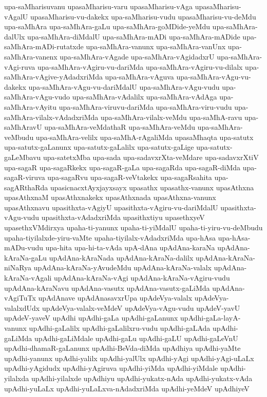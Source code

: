 {upa-saMharisuvanu
upasaMharisu-varu
upasaMharisu-vAga
upasaMharisu-vAgalU
upasaMharisu-vu-dakekx
upa-saMharisu-vudu
upasaMharisu-vu-deMdu
upa-saMhAra
upa-saMhAra-gaLu
upa-saMhAra-goMDide-yeMdu
upa-saMhAra-dalUlx
upa-saMhAra-diMdalU
upa-saMhAra-mADi
upa-saMhAra-mADide
upa-saMhAra-mADi-rutatxde
upa-saMhAra-vanunx
upa-saMhAra-vanUnx
upa-saMhAra-vanenx
upa-saMhAra-vAgade
upa-saMhAra-vAgidadxrU
upa-saMhAra-vAgi-ruva
upa-saMhAra-vAgiru-vu-dariMda
upa-saMhAra-vAgiru-vu-dilalx
upa-saMhAra-vAgive-yAdadxriMda
upa-saMhAra-vAguva
upa-saMhAra-vAgu-vu-dakekx
upa-saMhAra-vAgu-vu-dariMdalU
upa-saMhAra-vAgu-vudu
upa-saMhAra-vAgu-vudo
upa-saMhAra-vAdalilx
upa-saMhAra-vAdAga
upa-saMhAra-vAyitu
upa-saMhAra-viruvu-dariMda
upa-saMhAra-viru-vudu
upa-saMhAra-vilalx-vAdadxriMda
upa-saMhAra-vilalx-veMdu
upa-saMhA-ravu
upa-saMhAravU
upa-saMhAra-veMdathaR
upa-saMhAra-veMdu
upa-saMhAra-veMbudu
upa-saMhAra-velilx
upa-saMhA-rAgaliMda
upasaMhaqta
upa-satutx
upa-satutx-gaLanunx
upa-satutx-gaLalilx
upa-satutx-gaLige
upa-satutx-gaLeMbavu
upa-satetxMba
upa-sada
upa-sadavxrXta-veMdare
upa-sadavxrXtiV
upa-sagaR
upa-sagaRkekx
upa-sagaR-gaLa
upa-sagaRda
upa-sagaR-diMda
upa-sagaR-viruva
upa-sagaRvu
upa-sagaR-veVtakekx
upa-sagaRsahita
upa-sagARthaRda
upasicnacxtAyxjayxsayx
upasathx
upasathx-vanunx
upasAthxna
upasAthxnaM
upasAthxnakekx
upasAthxnada
upasAthxna-vanunx
upasAthxnavu
upasithxta-vAgiyU
upasithxta-vAgiru-vu-dariMdalU
upasithxta-vAgu-vudu
upasithxta-vAdadxriMda
upasithxtiyu
upasethxyeV
upasethxVMdirxya
upaha-ti-yanunx
upaha-ti-yiMdalU
upaha-ti-yiru-vu-deMbudu
upaha-tiyilalxde-yiru-vaMte
upaha-tiyilalx-vAdadxriMda
upa-hAsa
upa-hAsa-mADu-vudu
upa-hita
upa-hi-ta-vAda
upA-dAna
upAdAna-karaNa
upAdAna-kAraNa-gaLu
upAdAna-kAraNada
upAdAna-kAraNa-dalilx
upAdAna-kAraNa-niNaRya
upAdAna-kAraNa-yAvudeMdu
upAdAna-kAraNa-valalx
upAdAna-kAraNa-vAgali
upAdAna-kAraNa-vAgi
upAdAna-kAraNa-vAgiru-vudu
upAdAna-kAraNavu
upAdAna-vasutx
upAdAna-vasutx-gaLiMda
upAdAna-vAgiTuTx
upAdAnave
upAdAnasavxrUpa
upAdeVya-valalx
upAdeVya-valalxdUdx
upAdeVya-valalx-veMdeV
upAdeVya-vAgu-vudu
upAdeV-yavU
upAdeV-yaveV
upAdhi
upAdhi-gaLa
upAdhi-gaLanunx
upAdhi-gaLa-layA-vanunx
upAdhi-gaLalilx
upAdhi-gaLalilxru-vudu
upAdhi-gaLAda
upAdhi-gaLiMda
upAdhi-gaLiMdale
upAdhi-gaLu
upAdhi-gaLU
upAdhi-gaLeVnU
upAdhi-dhamaR-gaLanunx
upAdhi-BeVda-diMda
upAdhiya
upAdhi-yaMte
upAdhi-yanunx
upAdhi-yalilx
upAdhi-yalUlx
upAdhi-yAgi
upAdhi-yAgi-uLaLx
upAdhi-yAgidudx
upAdhi-yAgiruva
upAdhi-yiMda
upAdhi-yiMdale
upAdhi-yilalxda
upAdhi-yilalxde
upAdhiyu
upAdhi-yukatx-nAda
upAdhi-yukatx-vAda
upAdhi-yuLaLx
upAdhi-yuLaLxva-nAdadxriMda
upAdhi-yeMdeV
upAdhiyeV
}
